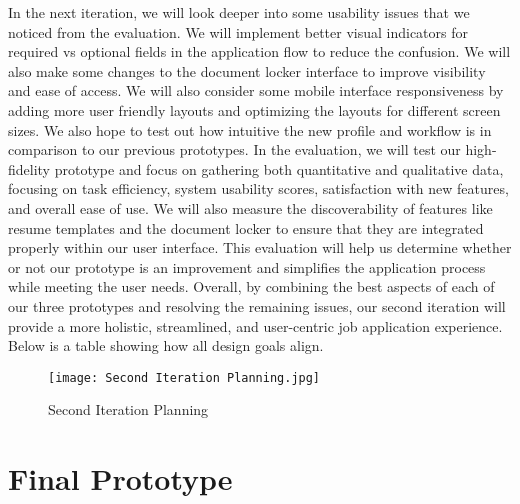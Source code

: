 \documentclass[
	letterpaper, %
]{jdf}
\begin{document}
\begin{sloppypar}
In the next iteration, we will look deeper into some usability issues that we noticed from the evaluation. We will implement better visual indicators for required vs optional fields in the application flow to reduce the confusion. We will also make some changes to the document locker interface to improve visibility and ease of access. We will also consider some mobile interface responsiveness by adding more user friendly layouts and optimizing the layouts for different screen sizes. We also hope to test out how intuitive the new profile and workflow is in comparison to our previous prototypes. In the evaluation, we will test our high-fidelity prototype and focus on gathering both quantitative and qualitative data, focusing on task efficiency, system usability scores, satisfaction with new features, and overall ease of use. We will also measure the discoverability of features like resume templates and the document locker to ensure that they are integrated properly within our user interface. This evaluation will help us determine whether or not our prototype is an improvement and simplifies the application process while meeting the user needs. Overall, by combining the best aspects of each of our three prototypes and resolving the remaining issues, our second iteration will provide a more holistic, streamlined, and user-centric job application experience. Below is a table showing how all design goals align.

\begin{figure}
    \centering
    \texttt{[image: Second Iteration Planning.jpg]}
    \caption{Second Iteration Planning}
    \label{fig:enter-label}
\end{figure}


\newpage
\section{Final Prototype}

\end{sloppypar}
\end{document}
